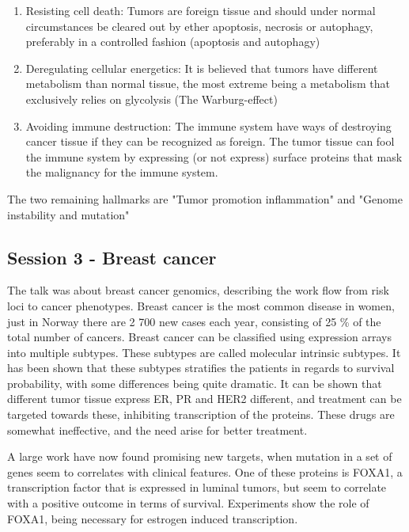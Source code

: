 \documentclass[12p]{article}
\begin{document}
\begin{enumerate}
  \item
    Resisting cell death:
    Tumors are foreign tissue and should under normal circumstances be cleared out by ether apoptosis, necrosis or autophagy, preferably in a controlled fashion (apoptosis and autophagy)
  \item
    Deregulating cellular energetics:
    It is believed that tumors have different metabolism than normal tissue, the most extreme being a metabolism that exclusively relies on glycolysis (The Warburg-effect)
  \item
    Avoiding immune destruction:
    The immune system have ways of destroying cancer tissue if they can be recognized as foreign.
    The tumor tissue can fool the immune system by expressing (or not express) surface proteins that mask the malignancy for the immune system.

\end{enumerate}
    
The two remaining hallmarks are "Tumor promotion inflammation" and "Genome instability and mutation"

\subsection*{Session 3 - Breast cancer}

The talk was about breast cancer genomics, describing the work flow from risk loci to cancer phenotypes.
Breast cancer is the most common disease in women, just in Norway there are 2 700 new cases each year, consisting of 25 \% of the total number of cancers.
Breast cancer can be classified using expression arrays into multiple subtypes.
These subtypes are called molecular intrinsic subtypes.
It has been shown that these subtypes stratifies the patients in regards to survival probability, with some differences being quite dramatic.
It can be shown that different tumor tissue express ER, PR and HER2 different, and treatment can be targeted towards these, inhibiting transcription of the proteins.
These drugs are somewhat ineffective, and the need arise for better treatment.

A large work have now found promising new targets, when mutation in a set of genes seem to correlates with clinical features.
One of these proteins is FOXA1, a transcription factor that is expressed in luminal tumors, but seem to correlate with a positive outcome in terms of survival.
Experiments show the role of FOXA1, being necessary for estrogen induced transcription.
\end{document}

